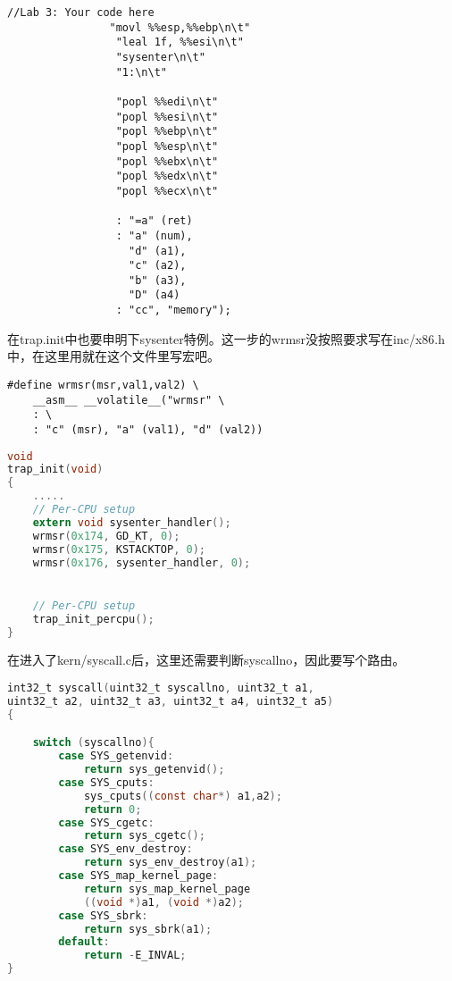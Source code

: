 \documentclass[11pt,a4paper]{article}
\begin{document}
\setmainfont{Consolas}
\begin{lstlisting}[language={[x86masm]Assembler},firstnumber=1,title=lib/syscall.c] 
//Lab 3: Your code here
				"movl %%esp,%%ebp\n\t"
                 "leal 1f, %%esi\n\t"
                 "sysenter\n\t"
                 "1:\n\t"

                 "popl %%edi\n\t"
                 "popl %%esi\n\t"
                 "popl %%ebp\n\t"
                 "popl %%esp\n\t"
                 "popl %%ebx\n\t"
                 "popl %%edx\n\t"
                 "popl %%ecx\n\t"
                 
                 : "=a" (ret)
                 : "a" (num),
                   "d" (a1),
                   "c" (a2),
                   "b" (a3),
                   "D" (a4)
                 : "cc", "memory");
\end{lstlisting}
\setmainfont[BoldFont=黑体]{宋体}

在trap.init中也要申明下sysenter特例。这一步的wrmsr没按照要求写在inc/x86.h中，在这里用就在这个文件里写宏吧。

\setmainfont{Consolas}
\begin{lstlisting}[language={[x86masm]Assembler},firstnumber=1,title=kern/trap.c] 
#define wrmsr(msr,val1,val2) \
	__asm__ __volatile__("wrmsr" \
	: \
	: "c" (msr), "a" (val1), "d" (val2))
\end{lstlisting}
\setmainfont[BoldFont=黑体]{宋体}

\setmainfont{Consolas}
\begin{lstlisting}[language={C},firstnumber=1,title=kern/trap.c] 
void
trap_init(void)
{
    .....
	// Per-CPU setup 
	extern void sysenter_handler();
	wrmsr(0x174, GD_KT, 0);
   	wrmsr(0x175, KSTACKTOP, 0);
	wrmsr(0x176, sysenter_handler, 0);


	// Per-CPU setup 
	trap_init_percpu();
}
\end{lstlisting}
\setmainfont[BoldFont=黑体]{宋体}


在进入了kern/syscall.c后，这里还需要判断syscallno，因此要写个路由。

\setmainfont{Consolas}
\begin{lstlisting}[language={C},firstnumber=1,title=kern/syscall.c] 
int32_t syscall(uint32_t syscallno, uint32_t a1,
uint32_t a2, uint32_t a3, uint32_t a4, uint32_t a5)
{

	switch (syscallno){
		case SYS_getenvid:
			return sys_getenvid();
		case SYS_cputs:
			sys_cputs((const char*) a1,a2);
			return 0;
		case SYS_cgetc:
			return sys_cgetc();
		case SYS_env_destroy:
			return sys_env_destroy(a1);
		case SYS_map_kernel_page:
			return sys_map_kernel_page
			((void *)a1, (void *)a2);
		case SYS_sbrk:
			return sys_sbrk(a1);
		default:
			return -E_INVAL;
}
\end{lstlisting}
\setmainfont[BoldFont=黑体]{宋体}
\end{document}
